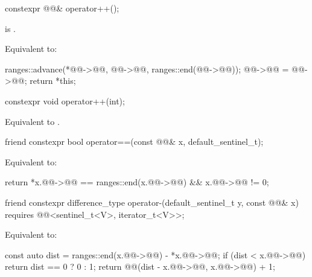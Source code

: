 \begin{itemdecl}
constexpr @@& operator++();
\end{itemdecl}

\begin{itemdescr}
\pnum
\expects
{} is .

\pnum
\effects
Equivalent to:
\begin{codeblock}
ranges::advance(*@@->@@, @@->@@, ranges::end(@@->@@));
@@->@@ = @@->@@;
return *this;
\end{codeblock}
\end{itemdescr}

\begin{itemdecl}
constexpr void operator++(int);
\end{itemdecl}

\begin{itemdescr}
\pnum
\effects
Equivalent to .
\end{itemdescr}

\begin{itemdecl}
friend constexpr bool operator==(const @@& x, default_sentinel_t);
\end{itemdecl}

\begin{itemdescr}
\pnum
\effects
Equivalent to:
\begin{codeblock}
return *x.@@->@@ == ranges::end(x.@@->@@) && x.@@->@@ != 0;
\end{codeblock}
\end{itemdescr}

\begin{itemdecl}
friend constexpr difference_type operator-(default_sentinel_t y, const @@& x)
  requires @@<sentinel_t<V>, iterator_t<V>>;
\end{itemdecl}

\begin{itemdescr}
\pnum
\effects
Equivalent to:
\begin{codeblock}
const auto dist = ranges::end(x.@@->@@) - *x.@@->@@;
if (dist < x.@@->@@) {
  return dist == 0 ? 0 : 1;
}
return @@(dist - x.@@->@@, x.@@->@@) + 1;
\end{codeblock}
\end{itemdescr}

